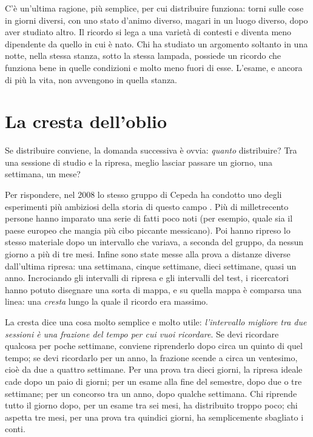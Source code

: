 C'è un'ultima ragione, più semplice, per cui distribuire funziona:
torni sulle cose in giorni diversi, con uno stato d'animo diverso,
magari in un luogo diverso, dopo aver studiato altro. Il ricordo si
lega a una varietà di contesti e diventa meno dipendente da quello in
cui è nato. Chi ha studiato un argomento soltanto in una notte, nella
stessa stanza, sotto la stessa lampada, possiede un ricordo che
funziona bene in quelle condizioni e molto meno fuori di esse. L'esame,
e ancora di più la vita, non avvengono in quella stanza.

\section{La cresta dell'oblio}

Se distribuire conviene, la domanda successiva è ovvia: \emph{quanto}
distribuire? Tra una sessione di studio e la ripresa, meglio lasciar
passare un giorno, una settimana, un mese?

Per rispondere, nel 2008 lo stesso gruppo di Cepeda ha condotto uno
degli esperimenti più ambiziosi della storia di questo campo
\parencite{cepeda2008}. Più di milletrecento persone hanno imparato una
serie di fatti poco noti (per esempio, quale sia il paese europeo che
mangia più cibo piccante messicano). Poi hanno ripreso lo stesso
materiale dopo un intervallo che variava, a seconda del gruppo, da
nessun giorno a più di tre mesi. Infine sono state messe alla prova a
distanze diverse dall'ultima ripresa: una settimana, cinque settimane,
dieci settimane, quasi un anno. Incrociando gli intervalli di ripresa e
gli intervalli del test, i ricercatori hanno potuto disegnare una sorta
di mappa, e su quella mappa è comparsa una linea: una \emph{cresta}
lungo la quale il ricordo era massimo.

La cresta dice una cosa molto semplice e molto utile: \emph{l'intervallo
migliore tra due sessioni è una frazione del tempo per cui vuoi
ricordare}. Se devi ricordare qualcosa per poche settimane, conviene
riprenderlo dopo circa un quinto di quel tempo; se devi ricordarlo per
un anno, la frazione scende a circa un ventesimo, cioè da due a quattro
settimane. Per una prova tra dieci giorni, la ripresa ideale cade dopo
un paio di giorni; per un esame alla fine del semestre, dopo due o tre
settimane; per un concorso tra un anno, dopo qualche settimana. Chi
riprende tutto il giorno dopo, per un esame tra sei mesi, ha
distribuito troppo poco; chi aspetta tre mesi, per una prova tra
quindici giorni, ha semplicemente sbagliato i conti.

